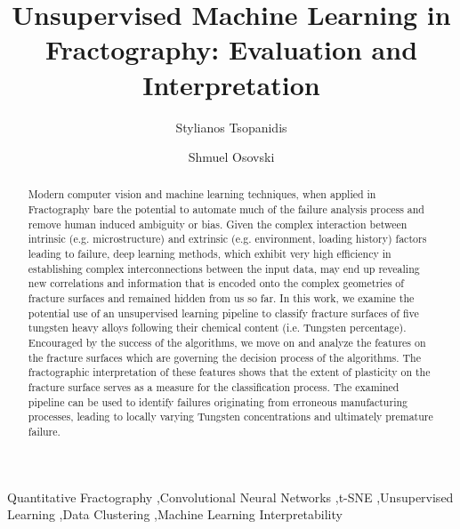 \documentclass[authoryear,preprint,review,12pt, singleside]{elsarticle}
\begin{document}

\begin{frontmatter}
	
	
	\title{Unsupervised Machine Learning in Fractography: Evaluation and Interpretation}

	
	
	\author[UC3M]{Stylianos Tsopanidis}
	\author[TEC]{Shmuel Osovski}
	
	
	
	\address [UC3M]{Department of Continuum Mechanics and Structural Analysis. University Carlos III of Madrid. Avda. de la Universidad, 30. 28911 Legan{\'e}s, Madrid, Spain}
	\address [TEC]{Faculty of Mechanical Engineering, Technion - Israel Institute of Technology, Haifa, Israel}


\begin{abstract}
Modern computer vision and machine learning techniques, when applied in Fractography bare the potential to automate much of the failure analysis process and remove human induced ambiguity or bias. Given the complex interaction between intrinsic (e.g. microstructure) and extrinsic (e.g. environment, loading history) factors leading to failure, deep learning methods, which exhibit very high efficiency in establishing complex interconnections between the input data, may end up revealing new correlations and  information that is encoded onto the complex geometries of fracture surfaces and remained hidden from us so far.  In this work, we examine the potential use of an unsupervised learning pipeline to classify fracture surfaces of five tungsten heavy alloys following their chemical content (i.e. Tungsten percentage). Encouraged by the success of the algorithms, we move on and analyze the features on the fracture surfaces which are governing the decision process of the algorithms.  The fractographic interpretation of these features shows that the extent of plasticity on the fracture surface serves as a measure for the classification process. The examined pipeline can be used to identify failures originating from erroneous manufacturing processes, leading to locally varying Tungsten concentrations and ultimately premature failure. 	
	
	
\end{abstract}




\begin{keyword}	
	
	Quantitative Fractography \sep Convolutional Neural Networks \sep t-SNE \sep Unsupervised Learning \sep Data Clustering  \sep Machine Learning Interpretability 
	
\end{keyword}





\end{frontmatter}
\end{document}
